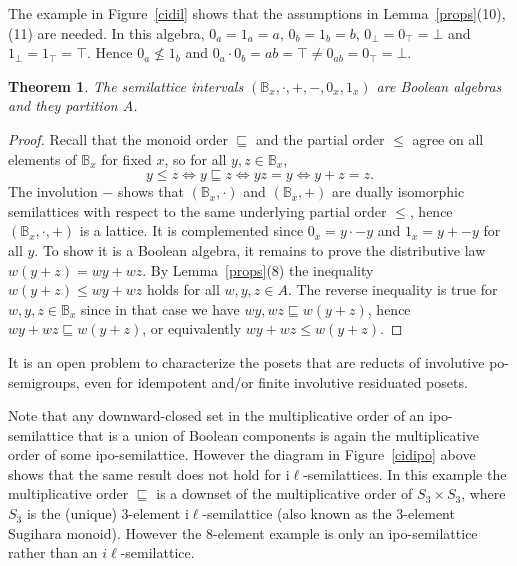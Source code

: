 \documentclass[12pt]{amsart}
\newtheorem{theorem}{Theorem}%
\begin{document}
The example in Figure~\ref{cidil} shows that the assumptions in Lemma~\ref{props}(10), (11) are needed. In this algebra, $0_a=1_a=a$, $0_b=1_b=b$, $0_\bot=0_\top=\bot$ and $1_\bot=1_\top=\top$. Hence $0_a\nleq 1_b$ and $0_a\cdot 0_b=ab=\top\ne0_{ab}=0_\top=\bot$.

\begin{theorem}
The semilattice intervals $(\mathbb B_x,\cdot,+,-,0_x,1_x)$ are
Boolean algebras and they partition $A$.
\end{theorem}
\begin{proof}
Recall that the monoid order $\sqsubseteq$ and the partial order $\le$ agree on all elements of $\mathbb B_x$ for fixed $x$, so for all $y,z\in\mathbb B_x$,
$$
y\le z\iff y\sqsubseteq z\iff yz=y\iff y+z=z.
$$
The involution $-$ shows that
$(\mathbb B_x,\cdot)$ and $(\mathbb B_x,+)$ are dually isomorphic semilattices with respect to the same underlying partial order $\le$, hence $(\mathbb B_x,\cdot,+)$ is a lattice. It is complemented since $0_x=y\cdot -y$ and $1_x=y+-y$ for all $y$. To show it is a Boolean algebra, it remains to prove the distributive law $w(y+z)=wy+wz$. By Lemma~\ref{props}(8) the inequality $w(y+z)\le wy+wz$ holds for all $w,y,z\in A$. The reverse inequality is true for $w,y,z\in\mathbb B_x$ since
in that case we have $wy,wz\sqsubseteq w(y+z)$, hence $wy+wz\sqsubseteq w(y+z)$, or equivalently $wy+wz\le w(y+z)$.
\end{proof}

It is an open problem to characterize the posets that are reducts of involutive po-semigroups, even for idempotent and/or finite involutive residuated posets.

Note that any downward-closed set in the multiplicative order of an ipo-semilattice that is a union of Boolean components is again the multiplicative order of some ipo-semilattice. However the diagram in Figure~\ref{cidipo} above shows that the same result does not hold for i$\ell$-semilattices. In this example the multiplicative order $\sqsubseteq$ is a downset of the multiplicative order of $S_3\times S_3$, where $S_3$ is the (unique) 3-element i$\ell$-semilattice (also known as the 3-element Sugihara monoid). However the 8-element example is only an ipo-semilattice rather than an $i\ell$-semilattice.
\end{document}
